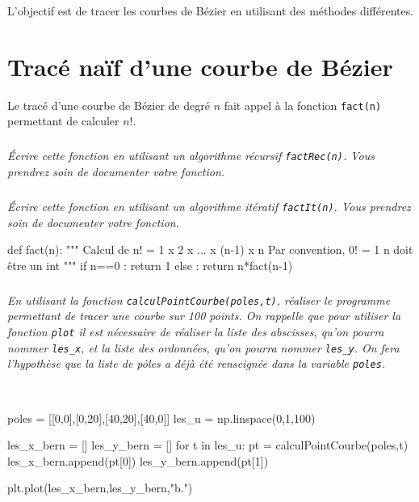 \documentclass[10pt,fleqn]{article} %
\begin{document}
\begin{obj}
L'objectif est de tracer les courbes de Bézier en utilisant des méthodes différentes.
\end{obj}

\section{Tracé naïf d'une courbe de Bézier}
Le tracé d'une courbe de Bézier de degré $n$ fait appel à la fonction \texttt{fact(n)} permettant de calculer $n!$. 
\subparagraph{}
\textit{Écrire cette fonction en utilisant un algorithme récursif \texttt{factRec(n)}. Vous prendrez soin de documenter votre fonction.}
\subparagraph{}
\textit{Écrire cette fonction en utilisant un algorithme itératif \texttt{factIt(n)}. Vous prendrez soin de documenter votre fonction.}
\ifprof
\begin{corrige}
\begin{py}
\begin{python}
def fact(n):
    """
    Calcul de n! = 1 x 2 x ... x (n-1) x n
    Par convention, 0! = 1
    n doit être un int
    """
    if n==0 :
        return 1
    else : 
        return n*fact(n-1)
\end{python}
\end{py}
\end{corrige}
\else
\fi

\subparagraph{}
\textit{En utilisant la fonction \texttt{calculPointCourbe(poles,t)}, réaliser le programme permettant de tracer une courbe sur 100 points. On rappelle que pour utiliser la fonction \texttt{plot} il est nécessaire de réaliser la liste des abscisses, qu'on pourra nommer \texttt{les\_x}, et la liste des ordonnées, qu'on pourra nommer \texttt{les\_y}. On fera l'hypothèse que la liste de pôles a déjà été renseignée dans la variable \texttt{poles}. }
\ifprof
\begin{corrige}~\\

\begin{py}
\begin{python}
poles = [[0,0],[0,20],[40,20],[40,0]]
les_u = np.linspace(0,1,100)

les_x_bern = []
les_y_bern = []
for t in les_u:
    pt = calculPointCourbe(poles,t)
    les_x_bern.append(pt[0])
    les_y_bern.append(pt[1])

plt.plot(les_x_bern,les_y_bern,"b.")
\end{python}
\end{py}    
\end{corrige}
\else
\fi
\end{document}
